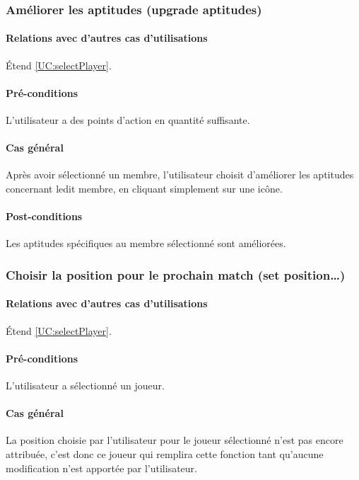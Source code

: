 \subsubsection{Améliorer les aptitudes (upgrade aptitudes)}
\label{UC:seeAptitudes}
\paragraph{Relations avec d'autres cas d'utilisations}
Étend \ref{UC:selectPlayer}.
\paragraph{Pré-conditions}
\begin{list}{}{\leftmargin=1.5em}
\item{L'utilisateur a des points d'action en quantité suffisante.}
\end{list}
\paragraph{Cas général}
Après avoir sélectionné un membre, l'utilisateur choisit d'améliorer les aptitudes concernant ledit membre, en cliquant simplement sur une icône.
\paragraph{Post-conditions}
\begin{list}{}{\leftmargin=1.5em}
\item{Les aptitudes spécifiques au membre sélectionné sont améliorées.}
\end{list} 

\subsubsection{Choisir la position pour le prochain match (set position…)}
\label{UC:choosePosition}
\paragraph{Relations avec d'autres cas d'utilisations}
Étend \ref{UC:selectPlayer}.
\paragraph{Pré-conditions}
L'utilisateur a sélectionné un joueur.
\paragraph{Cas général}
La position choisie par l'utilisateur pour le joueur sélectionné n'est pas encore attribuée, c'est donc ce joueur qui remplira cette fonction tant qu'aucune modification n'est apportée par l'utilisateur.
